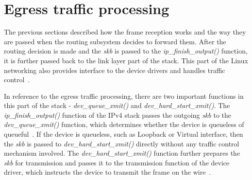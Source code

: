 
\section{Egress traffic processing}\label{sec:linux-egress}
The previous sections described how the frame reception works and the way they are passed when
the routing subsystem decides to forward them.
After the routing decision is made and the {\it{skb}} is passed to the {\it{ip\_finish\_output()}} function,
it is further passed back to the link layer part of the stack.
This part of the Linux networking also provides interface to the device drivers
and handles traffic control~\cite{understanding-internals}.

In reference to the egress traffic processing, there are two important functions in this part of the stack -
{\it{dev\_queue\_xmit()}} and {\it{dev\_hard\_start\_xmit()}}.
The {\it{ip\_finish\_output()}} function of the IPv4 stack passes the outgoing {\it{skb}}
to the {\it{dev\_queue\_xmit()}} function, which determines whether the device is queueless of queueful~\cite{understanding-internals}.
If the device is queueless, such as Loopback or Virtual interface, then the {\it{skb}} is passed to
{\it{dev\_hard\_start\_xmit()}} directly without any traffic control mechanism involved.
The {\it{dev\_hard\_start\_xmit()}} function further prepares the {\it{skb}} for transmission
and passes it to the transmission function of the device driver,
which instructs the device to transmit the frame on the wire~\cite{understanding-internals}.


